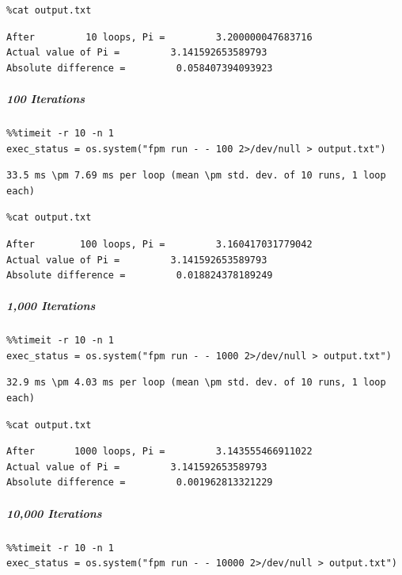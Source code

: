 \begin{verbatim}
%cat output.txt
\end{verbatim}

\begin{verbatim}
After         10 loops, Pi =         3.200000047683716
Actual value of Pi =         3.141592653589793
Absolute difference =         0.058407394093923
\end{verbatim}

\subparagraph{100 Iterations}

\begin{verbatim}
%%timeit -r 10 -n 1
exec_status = os.system("fpm run - - 100 2>/dev/null > output.txt")
\end{verbatim}

\begin{verbatim}
33.5 ms \pm 7.69 ms per loop (mean \pm std. dev. of 10 runs, 1 loop each)
\end{verbatim}

\begin{verbatim}
%cat output.txt
\end{verbatim}

\begin{verbatim}
After        100 loops, Pi =         3.160417031779042
Actual value of Pi =         3.141592653589793
Absolute difference =         0.018824378189249
\end{verbatim}

\subparagraph{1,000 Iterations}

\begin{verbatim}
%%timeit -r 10 -n 1
exec_status = os.system("fpm run - - 1000 2>/dev/null > output.txt")
\end{verbatim}

\begin{verbatim}
32.9 ms \pm 4.03 ms per loop (mean \pm std. dev. of 10 runs, 1 loop each)
\end{verbatim}

\begin{verbatim}
%cat output.txt
\end{verbatim}

\begin{verbatim}
After       1000 loops, Pi =         3.143555466911022
Actual value of Pi =         3.141592653589793
Absolute difference =         0.001962813321229
\end{verbatim}

\subparagraph{10,000 Iterations}

\begin{verbatim}
%%timeit -r 10 -n 1
exec_status = os.system("fpm run - - 10000 2>/dev/null > output.txt")
\end{verbatim}

